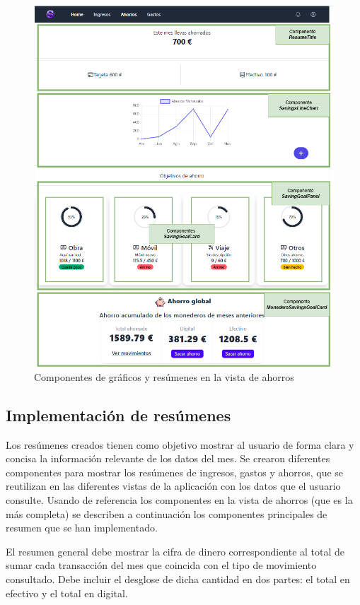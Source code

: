 \begin{figure}[ht!]
    \centering
    \includegraphics[width=\linewidth]{imagenes/componente-graficos-resumenes.drawio.png}
    \caption{Componentes de gráficos y resúmenes en la vista de ahorros}
    \label{fig:componentes_graficos_resumenes}
\end{figure}


\subsection{Implementación de resúmenes}
Los resúmenes creados tienen como objetivo mostrar al usuario de forma clara y concisa la información relevante de los datos del mes. Se crearon diferentes componentes para mostrar los resúmenes de ingresos, gastos y ahorros, que se reutilizan en las diferentes vistas de la aplicación con los datos que el usuario consulte. Usando de referencia los componentes en la vista de ahorros (que es la más completa) se describen a continuación los componentes principales de resumen que se han implementado.


El resumen general debe mostrar la cifra de dinero correspondiente al total de sumar cada transacción del mes que coincida con el tipo de movimiento consultado. Debe incluir el desglose de dicha cantidad en dos partes: el total en efectivo y el total en digital.


